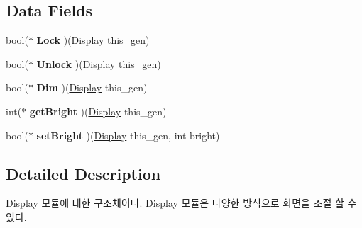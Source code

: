 \subsection*{Data Fields}
\begin{DoxyCompactItemize}
\item 
\hypertarget{struct__Display_a557767ebaa22f62498fffe89032523df}{bool($\ast$ {\bfseries Lock} )(\hyperlink{struct__Display}{Display} this\-\_\-gen)}\label{struct__Display_a557767ebaa22f62498fffe89032523df}

\item 
\hypertarget{struct__Display_ad515d0e58cc8ac1d10de258f03e31698}{bool($\ast$ {\bfseries Unlock} )(\hyperlink{struct__Display}{Display} this\-\_\-gen)}\label{struct__Display_ad515d0e58cc8ac1d10de258f03e31698}

\item 
\hypertarget{struct__Display_ae192dc196dde183f2cf56db0962c9b0b}{bool($\ast$ {\bfseries Dim} )(\hyperlink{struct__Display}{Display} this\-\_\-gen)}\label{struct__Display_ae192dc196dde183f2cf56db0962c9b0b}

\item 
\hypertarget{struct__Display_a61cbbbd330281072786ca6289de92a3a}{int($\ast$ {\bfseries get\-Bright} )(\hyperlink{struct__Display}{Display} this\-\_\-gen)}\label{struct__Display_a61cbbbd330281072786ca6289de92a3a}

\item 
\hypertarget{struct__Display_a575103bb316c02f1257bc34024495be2}{bool($\ast$ {\bfseries set\-Bright} )(\hyperlink{struct__Display}{Display} this\-\_\-gen, int bright)}\label{struct__Display_a575103bb316c02f1257bc34024495be2}

\end{DoxyCompactItemize}


\subsection{Detailed Description}
Display 모듈에 대한 구조체이다. Display 모듈은 다양한 방식으로 화면을 조절 할 수 있다. 

